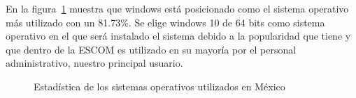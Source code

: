 En la figura~\ref{fig:vistalogica} muestra que windows está posicionado como el sistema operativo más utilizado con un 81.73\%. Se elige windows 10 de 64 bits como sistema operativo en el que será instalado el sistema debido a la popularidad que tiene y que dentro de la ESCOM es utilizado en su mayoría por el personal administrativo, nuestro principal usuario.

\begin{figure}[htbp!]
	\begin{center}
		\caption{Estadística de los sistemas operativos utilizados en México}
		\label{fig:vistalogica}
	\end{center}
\end{figure}


